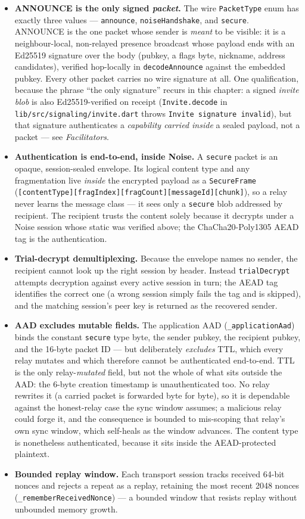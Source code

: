 \documentclass[11pt]{report}
\newcommand{\code}[1]{\texttt{\small #1}}
\begin{document}
\begin{itemize}
  \item \textbf{ANNOUNCE is the only signed \emph{packet}.} The wire \code{PacketType} enum has exactly three values — \code{announce}, \code{noiseHandshake}, and \code{secure}. ANNOUNCE is the one packet whose sender is \emph{meant} to be visible: it is a neighbour-local, non-relayed presence broadcast whose payload ends with an Ed25519 signature over the body (pubkey, a flags byte, nickname, address candidates), verified hop-locally in \code{decodeAnnounce} against the embedded pubkey. Every other packet carries no wire signature at all. One qualification, because the phrase ``the only signature'' recurs in this chapter: a signed \emph{invite blob} is also Ed25519-verified on receipt (\code{Invite.decode} in \code{lib/src/signaling/invite.dart} throws \code{Invite signature invalid}), but that signature authenticates a \emph{capability carried inside} a sealed payload, not a packet — see \emph{Facilitators}.
  \item \textbf{Authentication is end-to-end, inside Noise.} A \code{secure} packet is an opaque, session-sealed envelope. Its logical content type and any fragmentation live \emph{inside} the encrypted payload as a \code{SecureFrame} (\code{[contentType][fragIndex][fragCount][messageId][chunk]}), so a relay never learns the message class — it sees only a \code{secure} blob addressed by recipient. The recipient trusts the content solely because it decrypts under a Noise session whose static was verified above; the ChaCha20-Poly1305 AEAD tag is the authentication.
  \item \textbf{Trial-decrypt demultiplexing.} Because the envelope names no sender, the recipient cannot look up the right session by header. Instead \code{trialDecrypt} attempts decryption against every active session in turn; the AEAD tag identifies the correct one (a wrong session simply fails the tag and is skipped), and the matching session's peer key is returned as the recovered sender.
  \item \textbf{AAD excludes mutable fields.} The application AAD (\code{\_applicationAad}) binds the constant \code{secure} type byte, the sender pubkey, the recipient pubkey, and the 16-byte packet ID — but deliberately \emph{excludes} TTL, which every relay mutates and which therefore cannot be authenticated end-to-end. TTL is the only relay-\emph{mutated} field, but not the whole of what sits outside the AAD: the 6-byte creation timestamp is unauthenticated too. No relay rewrites it (a carried packet is forwarded byte for byte), so it is dependable against the honest-relay case the sync window assumes; a malicious relay could forge it, and the consequence is bounded to mis-scoping that relay's own sync window, which self-heals as the window advances. The content type is nonetheless authenticated, because it sits inside the AEAD-protected plaintext.
  \item \textbf{Bounded replay window.} Each transport session tracks received 64-bit nonces and rejects a repeat as a replay, retaining the most recent 2048 nonces (\code{\_rememberReceivedNonce}) — a bounded window that resists replay without unbounded memory growth.
\end{itemize}
\end{document}
